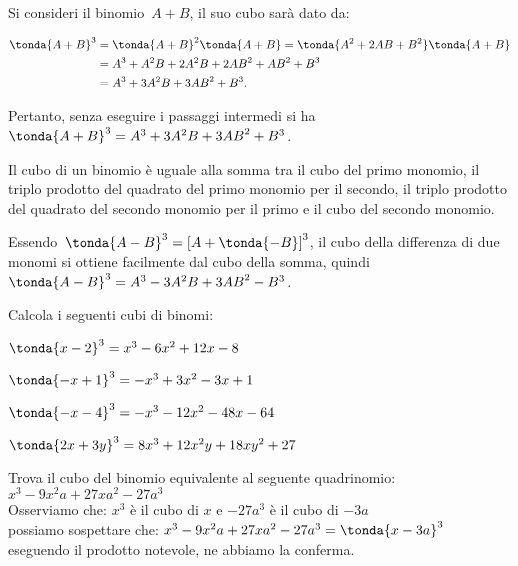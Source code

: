 Si consideri il binomio~\(A+B\), il suo cubo sarà dato da:

\begin{align*}
\tonda{A+B}^{3}&=\tonda{A+B}^{2}\tonda{A+B}=\tonda{A^{2}+2{AB}
+B^{2}}\tonda{A+B}\\
&=A^{3}+A^{2}B+2A^{2}B+2{AB}^{2}+{AB}^{2}+B^{3}\\
&=A^{3}+3A^{2}B+3{AB}^{2}+B^{3}.
\end{align*}

Pertanto, senza eseguire i passaggi intermedi si ha
\(\tonda{A+B}^{3}=A^{3}+3A^{2}B+3{AB}^{2}+B^{3}\).

\osservazione Il cubo di un binomio è uguale alla somma tra il
cubo del primo monomio, il triplo prodotto del quadrato del primo
monomio per il secondo, il triplo prodotto del quadrato del secondo
monomio per il primo e il cubo del secondo monomio.

Essendo~\(\tonda{A-B}^{3}=\left[A+\tonda{-B}\right]^{3}\), il
cubo della differenza di due monomi si ottiene facilmente dal cubo
della somma, quindi
\(\tonda{A-B}^{3}=A^{3}-3A^{2}B+3{AB}^{2}-B^{3}\).

\begin{esempio} Calcola i seguenti cubi di binomi:
\begin{multicols}{2}
\begin{enumeratea}
\item \(\tonda{x-2}^3= x^3-6x^2+12x-8\)
\item \(\tonda{-x+1}^3= -x^3+3x^2-3x+1\)
\item \(\tonda{-x-4}^3= -x^3-12x^2-48x-64\)
\item \(\tonda{2x+3y}^3= 8x^3+12x^2y+18xy^2+27\)
\end{enumeratea}
\end{multicols}
\end{esempio}

\begin{esempio}
Trova il cubo del binomio equivalente al seguente quadrinomio:\\
\(x^3-9x^2a+27xa^2-27a^3\)\\
Osserviamo che: \(x^3\) è il cubo di \(x\) \quad 
e \quad \(-27a^3\) è il cubo di \(-3a\)\\
possiamo sospettare che: \(x^3-9x^2a+27xa^2-27a^3 = \tonda{x-3a}^3\)\\
eseguendo il prodotto notevole, ne abbiamo la conferma.
\end{esempio}

